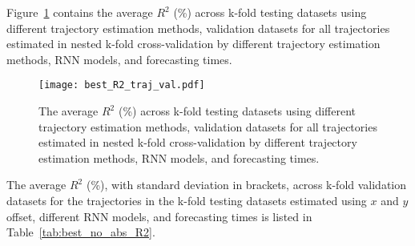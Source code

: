 Figure~\ref{fig:best_R2_traj_val} contains the average $R^{2}$ (\%) across k-fold testing datasets using different trajectory estimation methods, validation datasets for all trajectories estimated in nested k-fold cross-validation by different trajectory estimation methods, RNN models, and forecasting times.

\begin{figure}[!ht]
	\centering
	\texttt{[image: best\_R2\_traj\_val.pdf]}
	\caption{The average $R^{2}$ (\%) across k-fold testing datasets using different trajectory estimation methods, validation datasets for all trajectories estimated in nested k-fold cross-validation by different trajectory estimation methods, RNN models, and forecasting times.}
	\label{fig:best_R2_traj_val}
\end{figure}

The average $R^{2}$ (\%), with standard deviation in brackets, across k-fold validation datasets for the trajectories in the k-fold testing datasets estimated using $x$ and $y$ offset, different RNN models, and forecasting times is listed in Table~\ref{tab:best_no_abs_R2}.

\begin{table}[!ht]
	\centering
	\caption{The average $R^{2}$ (\%), with standard deviation in brackets, across k-fold validation datasets for the trajectories in the k-fold testing datasets estimated using $x$ and $y$ offset, different RNN models, and forecasting times.}
	\label{tab:best_no_abs_R2}
\end{table}

